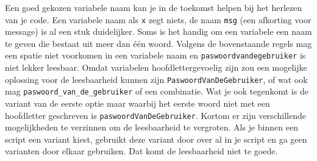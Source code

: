 Een goed gekozen variabele naam kan je in de toekomst helpen bij het herlezen van je code. Een variabele naam als \texttt{x} zegt niets, de naam \texttt{msg} (een afkorting voor message) is al een stuk duidelijker. Soms is het handig om een variabele een naam te geven die bestaat uit meer dan \'e\'en woord. Volgens de bovenstaande regels mag een spatie niet voorkomen in een variabele naam en \texttt{paswoordvandegebruiker} is niet lekker leesbaar. Omdat variabelen hoofdlettergevoelig zijn zou een mogelijke oplossing voor de leesbaarheid kunnen zijn \texttt{PaswoordVanDeGebruiker}, of wat ook mag \texttt{paswoord\_van\_de\_gebruiker} of een combinatie. Wat je ook tegenkomt is de variant van de eerste optie maar waarbij het eerste woord niet met een hoofdletter geschreven is \texttt{paswoordVanDeGebruiker}. Kortom er zijn verschillende mogelijkheden te verzinnen om de leesbaarheid te vergroten. Als je binnen een script een variant kiest, gebruikt deze variant door over al in je script en ga geen varianten door elkaar gebruiken. Dat komt de leesbaarheid niet te goede.

